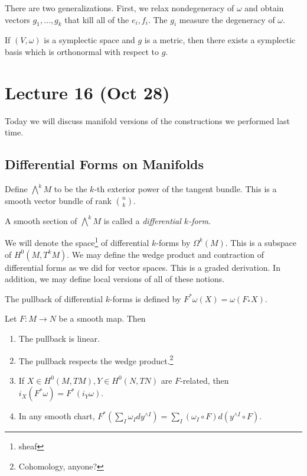\documentclass[twoside, 10pt]{article}
\begin{document}
    There are two generalizations. First, we relax nondegeneracy of $\omega$
    and obtain vectors $g_1, \ldots, g_k$ that kill all of the $e_i,f_i$. The
    $g_i$ measure the degeneracy of $\omega$.

    If $(V,\omega)$ is a symplectic space and $g$ is a metric, then there
    exists a symplectic basis which is orthonormal with respect to $g$.

    \section{Lecture 16 (Oct 28)}%
    
    Today we will discuss manifold versions of the constructions we performed
    last time. 

    \subsection{Differential Forms on Manifolds}%
    \label{sub:differential_forms_on_manifolds}
    
    Define $\bigwedge^kM$ to be the $k$-th exterior power of the tangent
    bundle. This is a smooth vector bundle of rank $\binom{n}{k}$.

    \begin{defn} A smooth section of $\bigwedge^k M$ is called a
    \textit{differential $k$-form}.  \end{defn}

    We will denote the space\footnote{sheaf} of differential $k$-forms by
    $\Omega^k(M)$. This is a subspace of $H^0(M, T^kM)$. We may define the
    wedge product and contraction of differential forms as we did for vector
    spaces. This is a graded derivation. In addition, we may define local
    versions of all of these notions.

    \begin{defn} The pullback of differential $k$-forms is defined by
    $F^*\omega (X) = \omega (F_*X)$.  \end{defn}

    \begin{lem} Let $F:M \to N$ be a smooth map. Then \begin{enumerate} \item
        The pullback is linear.  \item The pullback respects the wedge
        product.\footnote{Cohomology, anyone?} \item If $X \in H^0(M,TM), Y \in
        H^0(N,TN)$ are $F$-related, then $i_X(F^*\omega) = F^*(i_Y \omega)$.
        \item In any smooth chart, $F^*(\sum_I \omega_I dy^{\wedge I}) = \sum_I
    (\omega_I \circ F) d(y^{\wedge I} \circ F)$.  \end{enumerate} \end{lem}
\end{document}
